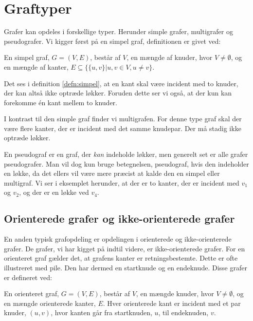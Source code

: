 \section{Graftyper}
Grafer kan opdeles i forskellige typer. Herunder simple grafer, multigrafer og pseudografer. Vi kigger først på en simpel graf, definitionen er givet ved:
\begin{defn} \label{defn:simpel}
 
En simpel graf, $G=(V,E)$, består af $V$, en mængde af knuder, hvor $V \neq \emptyset$, og en mængde af kanter, $E \subseteq \{\{u,v\}|u,v \in V, u \neq v\}$.
\end{defn}

Det ses i definition \ref{defn:simpel}, at en kant skal være incident med to knuder, der kan altså ikke optræde løkker. Foruden dette ser vi også, at der kun kan forekomme én kant mellem to knuder. 



I kontrast til den simple graf finder vi multigrafen. For denne type graf skal der være flere kanter, der er incident med det samme knudepar. Der må stadig ikke optræde løkker.



En pseudograf er en graf, der \emph{kan} indeholde løkker, men generelt set er alle grafer pseudografer. Man vil dog kun bruge betegnelsen, pseudograf, hvis den indeholder en løkke, da det ellers vil være mere præcist at kalde den en simpel eller multigraf. Vi ser i eksemplet herunder, at der er to kanter, der er incident med $v_{1}$ og $v_{2}$, og der er en løkke ved $v_{4}$.




\subsection{Orienterede grafer og ikke-orienterede grafer}
En anden typisk grafopdeling er opdelingen i orienterede og ikke-orienterede grafer. De grafer, vi har kigget på indtil videre, er ikke-orienterede grafer. For en orienteret graf gælder det, at grafens kanter er retningsbestemte. Dette er ofte illustreret med pile. Den har dermed en startknude og en endeknude. Disse grafer er defineret ved:

\begin{defn}

En orienteret graf, $G=(V,E)$, består af $V$, en mængde knuder, hvor $V \neq \emptyset$, og en mængde orienterede kanter, $E$. Hver orienterede kant er incident med et par knuder, $(u,v)$, hvor kanten går fra startknuden, $u$, til endeknuden, $v$. 
\end{defn}

